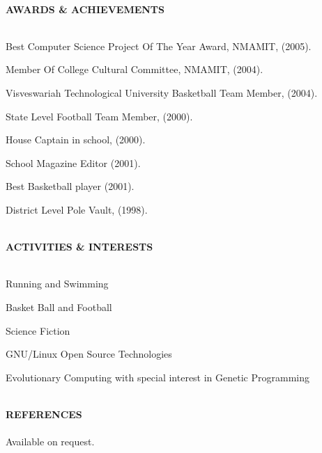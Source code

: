 \documentclass[10pt]{article}
\newcommand{\lineunder}{\vspace*{-10pt} \\ \hspace*{-18pt} \hrulefill \vspace{2pt}\\}
\newcommand{\header}[1]{{\hspace*{-15pt}\vspace*{-0pt}\\ \uppercase{\textbf {#1}}}  \lineunder}
\newenvironment{achievements}{
        \vspace{-0pt}
        \begin{list}
        {}
        {\topsep 0pt \itemsep -3pt}
}
{
        \end{list}
}
\begin{document}
\header{Awards \& Achievements} 
\begin{achievements}
\item Best Computer Science Project Of The Year Award, NMAMIT, (2005). \\
\item Member Of College Cultural Committee, NMAMIT, (2004). \\
\item Visveswariah Technological University Basketball Team Member, (2004).\\
\item State Level Football Team Member, (2000).\\
\item House Captain in school, (2000).\\
\item School Magazine Editor (2001).\\
\item Best Basketball player (2001). \\
\item District Level Pole Vault, (1998).\\
\end{achievements}

\header{Activities \& Interests} 
\begin{achievements}
\item Running and Swimming \\
\item Basket Ball and Football \\
\item Science Fiction \\
\item GNU/Linux Open Source Technologies \\
\item Evolutionary Computing with special interest in Genetic Programming \\
\end{achievements}

\header{References}
  Available on request.
\thispagestyle{empty}
\end{document}
